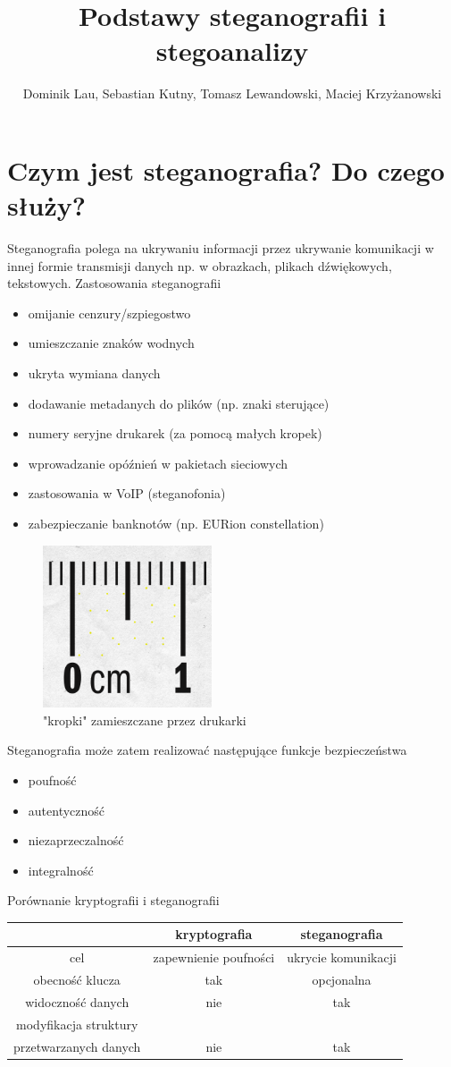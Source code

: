 \documentclass{article}
\title{Podstawy steganografii i stegoanalizy}
\author{Dominik Lau, Sebastian Kutny, Tomasz Lewandowski, Maciej Krzyżanowski}
\begin{document}
\maketitle
\section{Czym jest steganografia? Do czego służy?}
Steganografia polega na ukrywaniu informacji przez ukrywanie komunikacji w innej formie transmisji danych
np. w obrazkach,  plikach dźwiękowych, tekstowych.  Zastosowania steganografii
\begin{itemize}
	\item omijanie cenzury/szpiegostwo
	\item umieszczanie znaków wodnych
	\item ukryta wymiana danych
	\item dodawanie metadanych do plików (np. znaki sterujące)
	\item numery seryjne drukarek (za pomocą małych kropek)
	\item wprowadzanie opóźnień w pakietach sieciowych
	\item zastosowania w VoIP (steganofonia)
	\item zabezpieczanie banknotów (np. EURion constellation)
\end{itemize}
\begin{figure}
	\centering
	\includegraphics[width=5cm]{stego_drukarkowa}
	\caption{"kropki" zamieszczane przez drukarki}
\end{figure}
Steganografia może zatem realizować następujące funkcje bezpieczeństwa
\begin{itemize}
	\item poufność
	\item autentyczność
	\item niezaprzeczalność
	\item integralność
\end{itemize}
Porównanie kryptografii i steganografii
\begin{center}
\begin{tabular}{c | c  c }
& kryptografia & steganografia \\
\hline
cel & zapewnienie poufności & ukrycie komunikacji \\
obecność klucza & tak & opcjonalna \\
widoczność danych & nie & tak \\
modyfikacja struktury  \\
 przetwarzanych danych & nie & tak
\end{tabular}
\end{center}
\end{document}
